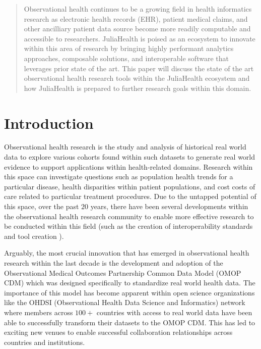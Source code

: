 \documentclass{juliacon}
\begin{document}


\maketitle

\begin{abstract}

Observational health continues to be a growing field in health informatics research as electronic health records (EHR), patient medical claims, and other ancilliary patient data source become more readily computable and accessible to researchers.
JuliaHealth is poised as an ecosystem to innovate within this area of research by bringing highly performant analytics approaches, composable solutions, and interoperable software that leverages prior state of the art. 
This paper will discuss the state of the art observational health research tools within the JuliaHealth ecosystem and how JuliaHealth is prepared to further research goals within this domain.

\end{abstract}

\section{Introduction}

Observational health research is the study and analysis of historical real world data to explore various cohorts found within such datasets to generate real world evidence to support applications within health-related domains.
Research within this space can investigate questions such as population health trends for a particular disease, health disparities within patient populations, and cost costs of care related to particular treatment procedures.
Due to the untapped potential of this space, over the past $20$ years, there have been several developments within the observational health research community to enable more effective research to be conducted within this field (such as the creation of interoperability standards and tool creation \cite{benderHL7FHIRAgile2013; mandelSMARTFHIRStandardsbased2016; overhage2012validation}).

Arguably, the most crucial innovation that has emerged in observational health research within the last decade is the development and adoption of the Observational Medical Outcomes Partnership Common Data Model (OMOP CDM) which was designed specifically to standardize real world health data. \cite{overhage2012validation}
The importance of this model has become apparent within open science organizations like the OHDSI (Observational Health Data Science and Informatics) network where members across $100+$ countries \cite{sachsonOurJourney2023} with access to real world data have been able to successfully transform their datasets to the OMOP CDM.
This has led to exciting new venues to enable successful collaboration relationships \cite{roseFindingAnswersBig2008} across countries and institutions. 
\end{document}

